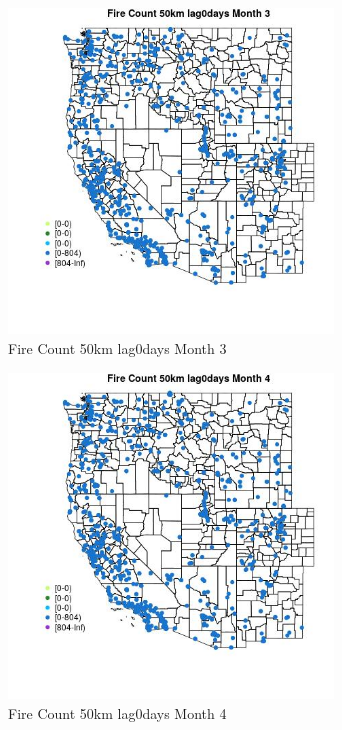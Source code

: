 \begin{figure} 
\centering  
\includegraphics[width=0.77\textwidth]{Code_Outputs/Report_ML_input_PM25_Step4_part_f_de_duplicated_aves_prioritize_24hr_obswNAs_MapObsMo3Fire_Count_50km_lag0days.jpg} 
\caption{\label{fig:Report_ML_input_PM25_Step4_part_f_de_duplicated_aves_prioritize_24hr_obswNAsMapObsMo3Fire_Count_50km_lag0days}Fire Count 50km lag0days Month 3} 
\end{figure} 
 

\begin{figure} 
\centering  
\includegraphics[width=0.77\textwidth]{Code_Outputs/Report_ML_input_PM25_Step4_part_f_de_duplicated_aves_prioritize_24hr_obswNAs_MapObsMo4Fire_Count_50km_lag0days.jpg} 
\caption{\label{fig:Report_ML_input_PM25_Step4_part_f_de_duplicated_aves_prioritize_24hr_obswNAsMapObsMo4Fire_Count_50km_lag0days}Fire Count 50km lag0days Month 4} 
\end{figure} 
 

